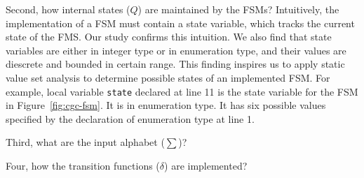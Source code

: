 Second, how internal states ($Q$) are maintained by the FSMs?
Intuitively, the implementation of a FSM must contain a state variable, 
which tracks the current state of the FMS.
Our study confirms this intuition. 
We also find that state variables are either in integer type or in enumeration type,
and their values are diescrete and bounded in certain range. 
This finding inspires us to apply static value set analysis 
to determine possible states of an implemented FSM.
For example, local variable \texttt{state} declared at line 11
is the state variable for the FSM in Figure~\ref{fig:cgc-fsm}.
It is in enumeration type.
It has six possible values specified by the declaration of 
enumeration type at line 1. 



Third, what are the input alphabet ($\sum$)? 

Four, how the transition functions ($\delta$) are implemented?

